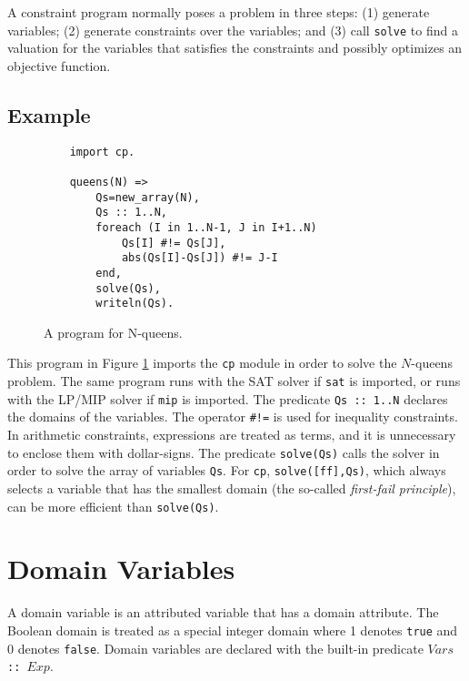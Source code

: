A constraint program normally poses a problem in three steps: (1) generate variables; (2) generate constraints over the variables; and (3) call \texttt{solve} to find a valuation for the variables that satisfies the constraints and possibly optimizes an objective function.

\subsection*{Example}
\begin{figure}[ht]
\begin{center}
\begin{verbatim}
    import cp.

    queens(N) =>
        Qs=new_array(N),
        Qs :: 1..N,
        foreach (I in 1..N-1, J in I+1..N)
            Qs[I] #!= Qs[J],
            abs(Qs[I]-Qs[J]) #!= J-I
        end,
        solve(Qs),
        writeln(Qs).
\end{verbatim}
\end{center}
\caption{\label{fig:nqueens} A program for N-queens.}
\end{figure}

This program in Figure \ref{fig:nqueens} imports the \texttt{cp} module in order to solve the $N$-queens problem. The same program runs with the SAT solver if \texttt{sat} is imported, or runs with the LP/MIP solver if \texttt{mip} is imported. The predicate \texttt{Qs :: 1..N} declares the domains of the variables. The operator \verb+#!=+ is used for inequality constraints. In arithmetic constraints, expressions are treated as terms, and it is unnecessary to enclose them with dollar-signs. The predicate \texttt{solve(Qs)} calls the solver in order to solve the array of variables \texttt{Qs}. For \texttt{cp}, \texttt{solve([ff],Qs)}, which always selects a variable that has the smallest domain (the so-called \emph{first-fail principle}), can be more efficient than \texttt{solve(Qs)}.


\section{Domain Variables}
A domain variable is an attributed variable that has a domain attribute. The Boolean domain is treated as a special integer domain where 1 denotes \texttt{true} and 0 denotes \texttt{false}. Domain variables are declared with the built-in predicate \texttt{$Vars$ :: $Exp$}. 

